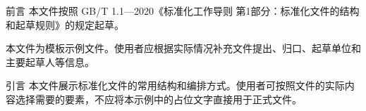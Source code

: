\begin{preamble}{前言}
    本文件按照 GB/T 1.1—2020《标准化工作导则 第1部分：标准化文件的结构和起草规则》的规定起草。

    本文件为模板示例文件。使用者应根据实际情况补充文件提出、归口、起草单位和主要起草人等信息。
\end{preamble}
\begin{preamble}{引言}
    本文件展示标准化文件的常用结构和编排方式。使用者可按照文件的实际内容选择需要的要素，不应将本示例中的占位文字直接用于正式文件。
\end{preamble}
